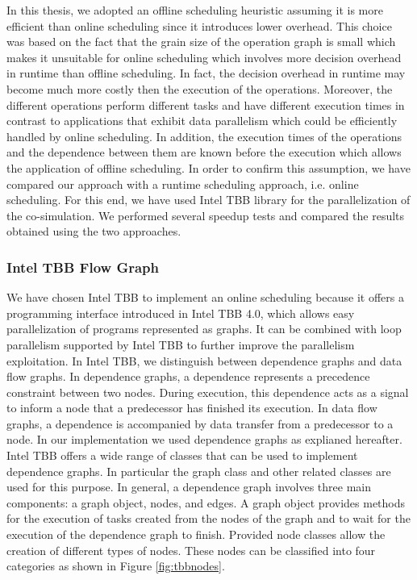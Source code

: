 In this thesis, we adopted an offline scheduling heuristic assuming it is more efficient than online scheduling since it introduces lower overhead. This choice was based on the fact that the grain size of the operation graph is small which makes it unsuitable for online scheduling which involves more decision overhead in runtime than offline scheduling. In fact, the decision overhead in runtime may become much more costly then the execution of the operations. Moreover, the different operations perform different tasks and have different execution times in contrast to applications that exhibit data parallelism which could be efficiently handled by online scheduling. In addition, the execution times of the operations and the dependence between them are known before the execution which allows the application of offline scheduling. In order to confirm this assumption, we have compared our approach with a runtime scheduling approach, i.e. online scheduling. For this end, we have used Intel TBB library for the parallelization of the co-simulation. We performed several speedup tests and compared the results obtained using the two approaches.

\subsubsection{Intel TBB Flow Graph}

We have chosen Intel TBB to implement an online scheduling because it offers a programming interface introduced in Intel TBB 4.0, which allows easy parallelization of programs represented as graphs. 
It can be combined with loop parallelism supported by Intel TBB to further improve the parallelism exploitation. 
In Intel TBB, we distinguish between dependence graphs and data flow graphs.
In dependence graphs, a dependence represents a precedence constraint between two nodes. During execution, this dependence acts as a signal to inform a node that a predecessor has finished its execution. 
In data flow graphs, a dependence is accompanied by data transfer from a predecessor to a node.
In our implementation we used dependence graphs as explianed hereafter.
Intel TBB offers a wide range of classes that can be used to implement dependence graphs. In particular the graph class and other related classes are used for this purpose. In general, a dependence graph involves three main components: a graph object, nodes, and edges. A graph object provides methods for the execution of tasks created from the nodes of the graph and to wait for the execution of the dependence graph to finish.
Provided node classes allow the creation of different types of nodes. These nodes can be classified into four categories as shown in Figure \ref{fig:tbbnodes}.


